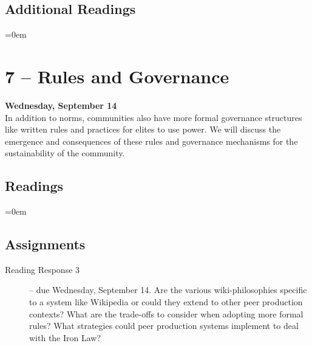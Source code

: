 \documentclass[10pt]{memoir}
\newenvironment{readinglist}{
\begin{list}{}{\leftmargin=8pt \itemindent=0em}
  \setlength{\itemsep}{8pt}
  \setlength{\parskip}{0em}
  \setlength{\parsep}{1em}
  \setlength{\parindent}{8em}}
{\end{list}}
\begin{document}
    \subsection{Additional Readings}
    \begin{readinglist}
        \item {}
        \item {}
        \item {}
        \item {}
    \end{readinglist}

\section{7 -- Rules and Governance}
\textcolor{CUGold}{\textbf{Wednesday, September 14}}\\
In addition to norms, communities also have more formal governance structures like written rules and practices for elites to use power. We will discuss the emergence and consequences of these rules and governance mechanisms for the sustainability of the community.

    \subsection{Readings}
    \begin{readinglist}
        \item {}
        \item {}
    \end{readinglist}
    
    \subsection{Assignments}
    \begin{description}%
        \item[Reading Response 3 ] -- due Wednesday, September 14. Are the various wiki-philosophies specific to a system like Wikipedia or could they extend to other peer production contexts? What are the trade-offs to consider when adopting more formal rules? What strategies could peer production systems implement to deal with the Iron Law?
    \end{description}
    
\end{document}
